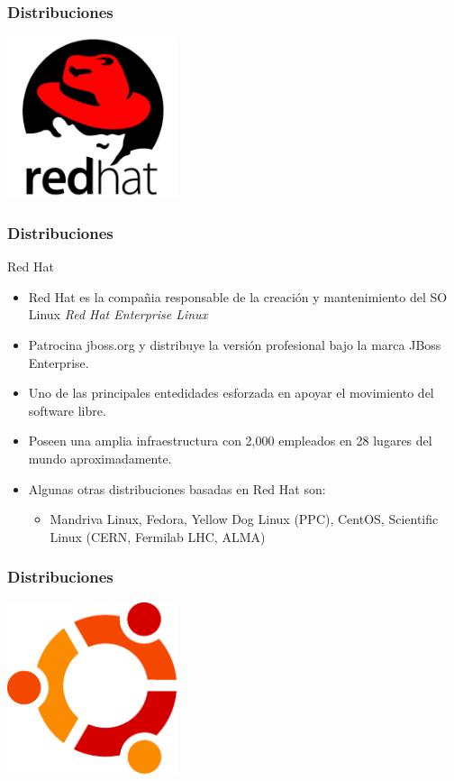 \frame
{
\frametitle{Distribuciones}
\vspace{1cm}
\begin{center}
	\includegraphics[width=5cm]{img/redhat}
\end{center}
}

\frame
{
\frametitle{Distribuciones}
\Large{Red Hat}
\normalsize
\begin{itemize}
	\item Red Hat es la compañia responsable de la creación y mantenimiento del SO Linux \emph{Red Hat Enterprise Linux}
	\item Patrocina jboss.org y distribuye la versión profesional bajo la marca JBoss Enterprise.
	\item Uno de las principales entedidades esforzada en apoyar el movimiento del software libre.
	\item Poseen una amplia infraestructura con 2,000 empleados en 28 lugares del mundo aproximadamente.
	\item Algunas otras distribuciones basadas en Red Hat son:
	\begin{itemize}
		\item Mandriva Linux, Fedora, Yellow Dog Linux (PPC), CentOS, Scientific Linux (CERN, Fermilab LHC, ALMA)
	\end{itemize}
\end{itemize}
}

\frame
{
\frametitle{Distribuciones}
\vspace{1cm}
\begin{center}
	\includegraphics[width=5cm]{img/ubuntu}
\end{center}
}



